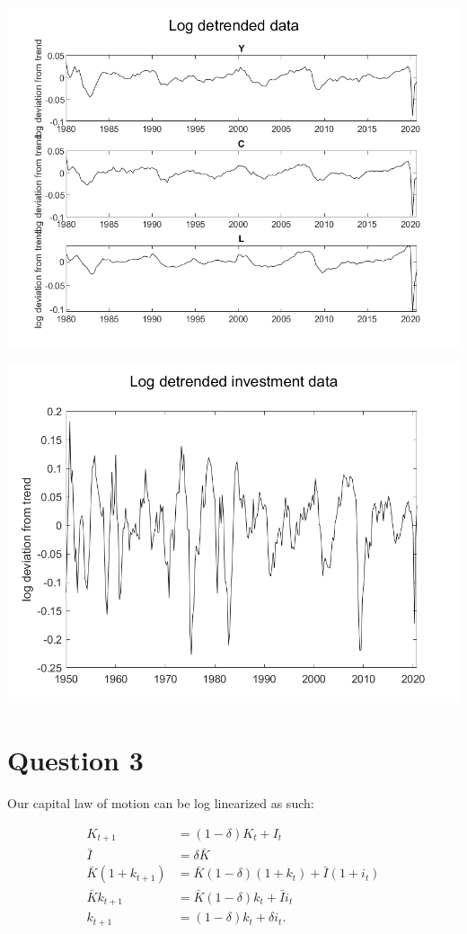 \documentclass[11pt]{article} %
\begin{document}
\includegraphics{det}

\includegraphics{deti}

\section{Question 3}

Our capital law of motion can be log linearized as such:

\begin{align*}
K_{t+1} &= (1-\delta) K_{t} + I_{t}\\
\bar{I} &= \delta \bar{K}\\
\bar{K}(1+k_{t+1}) &= \bar{K}(1-\delta)(1+k_t) + \bar{I}(1+i_t)\\
\bar{K}k_{t+1} &= \bar{K}(1-\delta)k_t + \bar{I}i_t\\
k_{t+1} &= (1-\delta)k_t + \delta i_t.
\end{align*}
\end{document}
